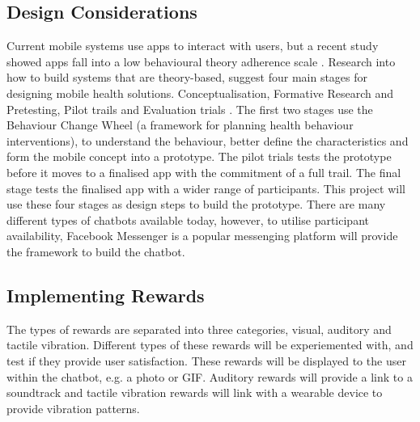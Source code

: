 \subsection{Design Considerations}
Current mobile systems use apps to interact with users, but a recent study showed apps fall into a low behavioural theory adherence scale \cite{article_mhealth}. Research into how to build systems that are theory-based, suggest four main stages for designing mobile health solutions. Conceptualisation, Formative Research and Pretesting, Pilot trails and Evaluation trials \cite{article_mhealth}. The first two stages use the Behaviour Change Wheel \cite{article_behaviour_change_wheel} (a framework for planning health behaviour interventions), to understand the behaviour, better define the characteristics and form the mobile concept into a prototype. The pilot trials tests the prototype before it moves to a finalised app with the commitment of a full trail. The final stage tests the finalised app with a wider range of participants. This project will use these four stages as design steps to build the prototype.\newline
\newline
There are many different types of chatbots available today, however, to utilise participant availability, Facebook Messenger is a popular messenging platform will provide the framework to build the chatbot.

\subsection{Implementing Rewards}
The types of rewards are separated into three categories, visual, auditory and tactile vibration. Different types of these rewards will be experiemented with, and test if they provide user satisfaction. These rewards will be displayed to the user within the chatbot, e.g. a photo or GIF. Auditory rewards will provide a link to a soundtrack and tactile vibration rewards will link with a wearable device to provide vibration patterns.

\newpage






